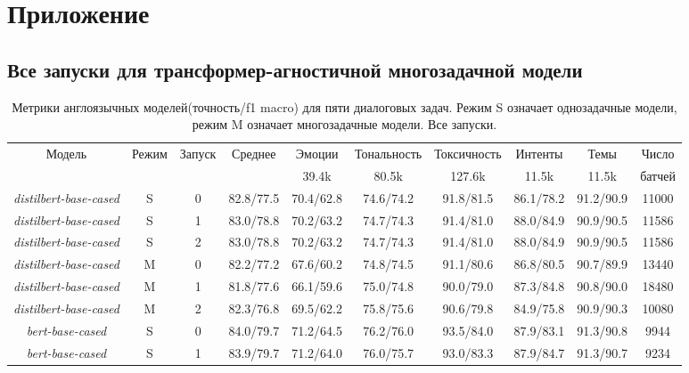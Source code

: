 \chapter{Приложение}\label{appendix}

\section{Все запуски для трансформер-агностичной многозадачной модели}\label{appendix:allruns_tr-ag}

\begin{table*}
\caption{Метрики англоязычных моделей(точность/f1 macro) для пяти диалоговых задач. Режим S означает однозадачные модели, режим M означает многозадачные модели. Все запуски.}
\label{appendix:tr-ag:en_results}
\begin{tabular}{|c|c|c||c|c|c|c|c|c||c|} \hline
\multirow{2}{*}{Модель} & \multirow{2}{*}{Режим} &  \multirow{2}{*}{Запуск} &\multirow{2}{*}{Среднее} & Эмоции & Тональность & Токсичность & Интенты & Темы & Число \\
& & & & 39.4k & 80.5k & 127.6k & 11.5k & 11.5k & батчей \\ \hline \hline
\textit{distilbert-base-cased}  & S & 0 & 82.8/77.5 & 70.4/62.8 & 74.6/74.2 & 91.8/81.5 & 86.1/78.2 & 91.2/90.9 & 11000 \\ \hline
\textit{distilbert-base-cased}  & S & 1 & 83.0/78.8 & 70.2/63.2 & 74.7/74.3 & 91.4/81.0 & 88.0/84.9 & 90.9/90.5 & 11586 \\ \hline
\textit{distilbert-base-cased} & S & 2 & 83.0/78.8 & 70.2/63.2 & 74.7/74.3 & 91.4/81.0 & 88.0/84.9 & 90.9/90.5 & 11586 \\ \hline
\textit{distilbert-base-cased} & M & 0 & 82.2/77.2 & 67.6/60.2 & 74.8/74.5 & 91.1/80.6 & 86.8/80.5 & 90.7/89.9 & 13440 \\ \hline
\textit{distilbert-base-cased} & M & 1 & 81.8/77.6 & 66.1/59.6 & 75.0/74.8 & 90.0/79.0 & 87.3/84.8 & 90.8/90.0 & 18480 \\ \hline
\textit{distilbert-base-cased} & M & 2 & 82.3/76.8 & 69.5/62.2 & 75.8/75.6 & 90.6/79.8 & 84.9/75.8 & 90.9/90.3 & 10080 \\ \hline
\textit{bert-base-cased} & S & 0 & 84.0/79.7 & 71.2/64.5 & 76.2/76.0 & 93.5/84.0 & 87.9/83.1 & 91.3/90.8 & 9944 \\ \hline
\textit{bert-base-cased} & S & 1 & 83.9/79.7 & 71.2/64.0 & 76.0/75.7 & 93.0/83.3 & 87.9/84.7 & 91.3/90.7 & 9234 \\ \hline

\end{tabular}
\end{table*}
